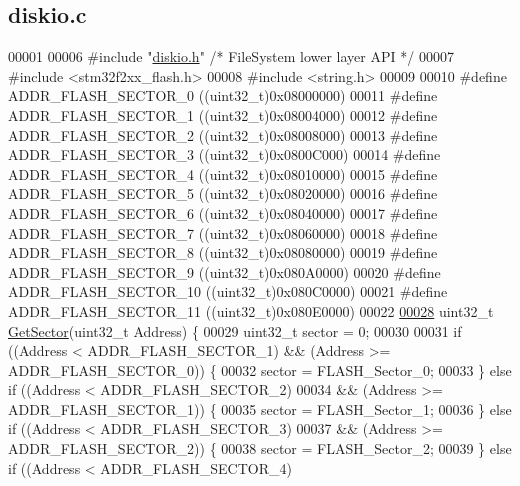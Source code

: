 \hypertarget{diskio_8c_source}{\subsection{diskio.\+c}
\label{diskio_8c_source}
}

\begin{DoxyCode}
00001 
00006 \textcolor{preprocessor}{#include "\hyperlink{diskio_8h}{diskio.h}"}    \textcolor{comment}{/* FileSystem lower layer API */}
00007 \textcolor{preprocessor}{#include <stm32f2xx\_flash.h>}
00008 \textcolor{preprocessor}{#include <string.h>}
00009 
00010 \textcolor{preprocessor}{#define ADDR\_FLASH\_SECTOR\_0     ((uint32\_t)0x08000000)}
00011 \textcolor{preprocessor}{#define ADDR\_FLASH\_SECTOR\_1     ((uint32\_t)0x08004000)}
00012 \textcolor{preprocessor}{#define ADDR\_FLASH\_SECTOR\_2     ((uint32\_t)0x08008000)}
00013 \textcolor{preprocessor}{#define ADDR\_FLASH\_SECTOR\_3     ((uint32\_t)0x0800C000)}
00014 \textcolor{preprocessor}{#define ADDR\_FLASH\_SECTOR\_4     ((uint32\_t)0x08010000)}
00015 \textcolor{preprocessor}{#define ADDR\_FLASH\_SECTOR\_5     ((uint32\_t)0x08020000)}
00016 \textcolor{preprocessor}{#define ADDR\_FLASH\_SECTOR\_6     ((uint32\_t)0x08040000)}
00017 \textcolor{preprocessor}{#define ADDR\_FLASH\_SECTOR\_7     ((uint32\_t)0x08060000)}
00018 \textcolor{preprocessor}{#define ADDR\_FLASH\_SECTOR\_8     ((uint32\_t)0x08080000)}
00019 \textcolor{preprocessor}{#define ADDR\_FLASH\_SECTOR\_9     ((uint32\_t)0x080A0000)}
00020 \textcolor{preprocessor}{#define ADDR\_FLASH\_SECTOR\_10    ((uint32\_t)0x080C0000)}
00021 \textcolor{preprocessor}{#define ADDR\_FLASH\_SECTOR\_11    ((uint32\_t)0x080E0000)}
00022 
\hypertarget{diskio_8c_source_l00028}{}\hyperlink{diskio_8h_a90db73e2ffb962de6891c783f62db0d0}{00028} uint32\_t \hyperlink{diskio_8c_a90db73e2ffb962de6891c783f62db0d0}{GetSector}(uint32\_t Address) \{
00029   uint32\_t sector = 0;
00030 
00031   \textcolor{keywordflow}{if} ((Address < ADDR\_FLASH\_SECTOR\_1) && (Address >= ADDR\_FLASH\_SECTOR\_0)) \{
00032     sector = FLASH\_Sector\_0;
00033   \} \textcolor{keywordflow}{else} \textcolor{keywordflow}{if} ((Address < ADDR\_FLASH\_SECTOR\_2)
00034       && (Address >= ADDR\_FLASH\_SECTOR\_1)) \{
00035     sector = FLASH\_Sector\_1;
00036   \} \textcolor{keywordflow}{else} \textcolor{keywordflow}{if} ((Address < ADDR\_FLASH\_SECTOR\_3)
00037       && (Address >= ADDR\_FLASH\_SECTOR\_2)) \{
00038     sector = FLASH\_Sector\_2;
00039   \} \textcolor{keywordflow}{else} \textcolor{keywordflow}{if} ((Address < ADDR\_FLASH\_SECTOR\_4)

\end{DoxyCode}
